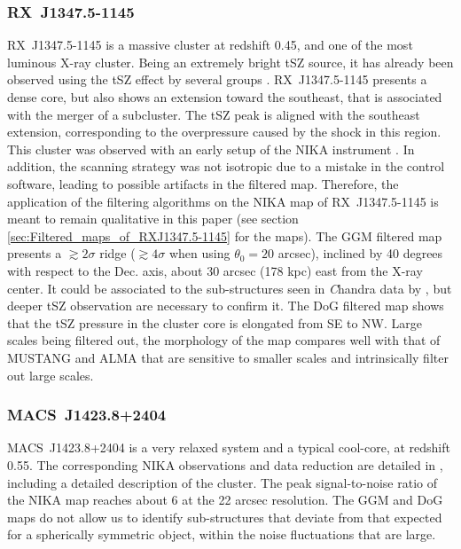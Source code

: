 \documentclass[twocolumn,traditabstract]{aa}
\begin{document}
\subsubsection{RX~J1347.5-1145}\label{sec:RXJ1347.5-1145}
\mbox{RX~J1347.5-1145} is a massive cluster at redshift 0.45, and one of the most luminous X-ray cluster. Being an extremely bright tSZ source, it has already been observed using the tSZ effect by several groups \citep[e.g.][]{Pointecouteau1999,Komatsu1999,Mason2010,Plagge2012,Adam2014,Sayers2016,Kitayama2016}. \mbox{RX~J1347.5-1145} presents a dense core, but also shows an extension toward the southeast, that is associated with the merger of a subcluster. The tSZ peak is aligned with the southeast extension, corresponding to the overpressure caused by the shock in this region. This cluster was observed with an early setup of the NIKA instrument \citep[bandpass, sensitivity, calibration procedure, see][for more details]{Adam2014}. In addition, the scanning strategy was not isotropic due to a mistake in the control software, leading to possible artifacts in the filtered map. Therefore, the application of the filtering algorithms on the NIKA map of \mbox{RX~J1347.5-1145} is meant to remain qualitative in this paper (see section \ref{sec:Filtered_maps_of_RXJ1347.5-1145} for the maps). The GGM filtered map presents a $\gtrsim 2 \sigma$ ridge ($\gtrsim 4 \sigma$ when using $\theta_0 = 20$ arcsec), inclined by 40 degrees with respect to the Dec. axis, about 30 arcsec (178 kpc) east from the X-ray center. It could be associated to the sub-structures seen in {\textit Chandra} data by \cite{Kreisch2016}, but deeper tSZ observation are necessary to confirm it. The DoG filtered map shows that the tSZ pressure in the cluster core is elongated from SE to NW. Large scales being filtered out, the morphology of the map compares well with that of MUSTANG \citep{Mason2010} and ALMA \citep{Kitayama2016} that are sensitive to smaller scales and intrinsically filter out large scales.

\subsubsection{MACS~J1423.8+2404}
\mbox{MACS~J1423.8+2404} is a very relaxed system and a typical cool-core, at redshift 0.55. The corresponding NIKA observations and data reduction are detailed in \citep{Adam2016a}, including a detailed description of the cluster. The peak signal-to-noise ratio of the NIKA map reaches about 6 at the 22 arcsec resolution. The GGM and DoG maps do not allow us to identify sub-structures that deviate from that expected for a spherically symmetric object, within the noise fluctuations that are large.
\end{document}
